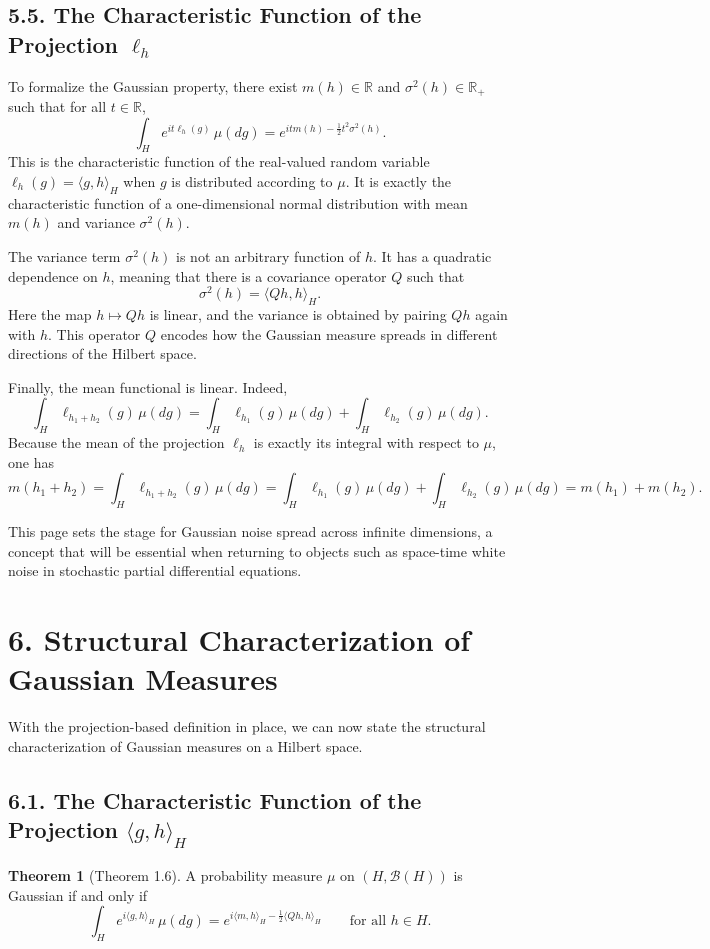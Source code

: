 \documentclass[11pt]{article}
\theoremstyle{definition}
\newtheorem{theorem}{Theorem}
\theoremstyle{remark}
\begin{document}
\subsection*{5.5. The Characteristic Function of the Projection $\ell_h$}
To formalize the Gaussian property, there exist $m(h)\in\mathbb R$ and $\sigma^2(h)\in\mathbb R_+$ such that for all $t\in\mathbb R$,
\[
\int_H e^{it\ell_h(g)}\,\mu(dg)=e^{itm(h)-\frac12 t^2\sigma^2(h)}.
\]
This is the characteristic function of the real-valued random variable $\ell_h(g)=\langle g,h\rangle_H$ when $g$ is distributed according to $\mu$. It is exactly the characteristic function of a one-dimensional normal distribution with mean $m(h)$ and variance $\sigma^2(h)$.

The variance term $\sigma^2(h)$ is not an arbitrary function of $h$. It has a quadratic dependence on $h$, meaning that there is a covariance operator $Q$ such that
\[
\sigma^2(h)=\langle Qh,h\rangle_H.
\]
Here the map $h\mapsto Qh$ is linear, and the variance is obtained by pairing $Qh$ again with $h$. This operator $Q$ encodes how the Gaussian measure spreads in different directions of the Hilbert space.

Finally, the mean functional is linear. Indeed,
\[
\int_H \ell_{h_1+h_2}(g)\,\mu(dg)=\int_H \ell_{h_1}(g)\,\mu(dg)+\int_H \ell_{h_2}(g)\,\mu(dg).
\]
Because the mean of the projection $\ell_h$ is exactly its integral with respect to $\mu$, one has
\[
m(h_1+h_2)
=
\int_H \ell_{h_1+h_2}(g)\,\mu(dg)
=
\int_H \ell_{h_1}(g)\,\mu(dg)+\int_H \ell_{h_2}(g)\,\mu(dg)
=
m(h_1)+m(h_2).
\]

This page sets the stage for Gaussian noise spread across infinite dimensions, a concept that will be essential when returning to objects such as space-time white noise in stochastic partial differential equations.

\section*{6. Structural Characterization of Gaussian Measures}
With the projection-based definition in place, we can now state the structural characterization of Gaussian measures on a Hilbert space.

\subsection*{6.1. The Characteristic Function of the Projection $\langle g,h\rangle_H$}
\begin{theorem}[Theorem 1.6]
A probability measure $\mu$ on $(H,\mathcal B(H))$ is Gaussian if and only if
\[
\int_H e^{i\langle g,h\rangle_H}\,\mu(dg)=e^{i\langle m,h\rangle_H-\frac12 \langle Qh,h\rangle_H}
\qquad \text{for all } h\in H.
\]
\end{theorem}
\end{document}
